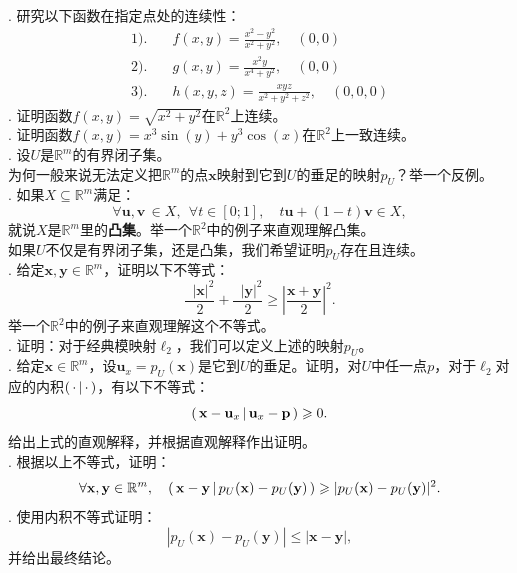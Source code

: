\documentclass[12pt,UTF8,fontset=none]{ctexbook}
\begin{document}
\begin{xt}
    \mbox{} \\
    . 研究以下函数在指定点处的连续性：
    \begin{align*}
    1).& \quad f(x, y) = \frac{x^2-y^2}{x^2+y^2}, \quad (0, 0) \\
    2).& \quad g(x, y) = \frac{x^2y}{x^4+y^2}, \quad (0, 0) \\
    3).& \quad h(x, y, z) = \frac{xyz}{x^2+y^2+z^2}, \quad (0, 0, 0)
    \end{align*}
    . 证明函数$f(x, y) = \sqrt{x^2+y^2}$在$\mathbb{R}^2$上连续。\\
    . 证明函数$f(x, y) = x^3\sin(y) + y^3\cos(x)$在$\mathbb{R}^2$上一致连续。\\
    . 设$U$是$\mathbb{R}^m$的有界闭子集。\\
     为何一般来说无法定义把$\mathbb{R}^m$的点$\mathbf{x}$映射到它到$U$的垂足的映射$p_U$？举一个反例。\\
    . 如果$X\subseteq \mathbb{R}^m$满足：
    $$ \forall \mathbf{u}, \mathbf{v}\, \in X, \;\, \forall t\in[0;1], \quad t\mathbf{u} + (1 - t)\mathbf{v} \in X,$$
    就说$X$是$\mathbb{R}^m$里的\textbf{凸集}。举一个$\mathbb{R}^2$中的例子来直观理解凸集。\\
    \indent 如果$U$不仅是有界闭子集，还是凸集，我们希望证明$p_U$存在且连续。\\
    . 给定$\mathbf{x}, \mathbf{y}\in \mathbb{R}^m$，证明以下不等式：
    $$ \frac{\phantom{0}|\mathbf{x}|^2}{2}  + \frac{\phantom{0}|\mathbf{y}|^2}{2}  \geqslant \left|\frac{\mathbf{x} + \mathbf{y}}{2}\right|^2. $$
    举一个$\mathbb{R}^2$中的例子来直观理解这个不等式。\\
    . 证明：对于经典模映射$\ell_2$，我们可以定义上述的映射$p_U$。\\
    . 给定$\mathbf{x}\in\mathbb{R}^m$，设$\mathbf{u}_x = p_U(\mathbf{x})$是它到$U$的垂足。证明，对$U$中任一点$p$，对于$\ell_2$对应的内积$\displaystyle\left( \,\cdot \,\middle\vert \,\cdot \,\right)$，有以下不等式：
    $$ \displaystyle\left( \,\mathbf{x} - \mathbf{u}_x \,\middle\vert \,\mathbf{u}_x - \mathbf{p} \,\right) \geqslant 0.$$
    给出上式的直观解释，并根据直观解释作出证明。\\
    . 根据以上不等式，证明：
    $$ \forall \mathbf{x}, \mathbf{y} \in \mathbb{R}^m, \quad \displaystyle\left( \,\mathbf{x} - \mathbf{y} \,\middle\vert \,p_U(\mathbf{x}) - p_U(\mathbf{y}) \,\right) \geqslant |p_U(\mathbf{x}) - p_U(\mathbf{y})|^2. $$
    . 使用内积不等式证明：
    $$ |p_U(\mathbf{x}) - p_U(\mathbf{y})| \leqslant |\mathbf{x} - \mathbf{y}|, $$
    并给出最终结论。
\end{xt}
\end{document}
